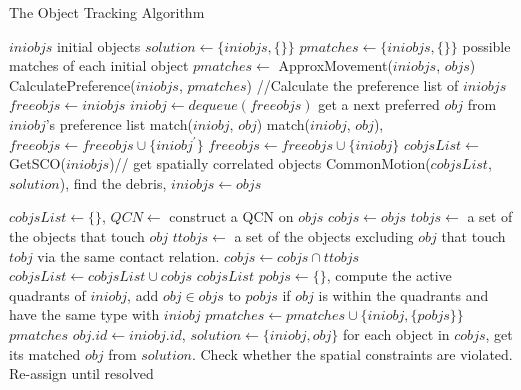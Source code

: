 \documentclass[letterpaper]{article}
\begin{document}
\begin{algorithm}[!]
\caption{The Object Tracking Algorithm}\label{algo}
\begin{algorithmic}[1]
\State $iniobjs$ \Comment initial objects
\State $solution \leftarrow \{iniobjs, \{\}\}$
\State $pmatches \leftarrow \{iniobjs, \{\}\}$ \Comment possible matches of each initial object
\State $pmatches \leftarrow$ ApproxMovement($iniobjs$, $objs$) \label{SetPossible}
\State CalculatePreference($iniobjs$, $pmatches$)\label{calPref} //Calculate the preference list of $iniobjs$
\State $freeobjs \leftarrow iniobjs$
\label{stableMarriage}
\State $iniobj \leftarrow dequeue(freeobjs)$
\State get a next preferred $obj$ from $iniobj$'s preference list  
  \State match($iniobj$, $obj$)
  \State match($iniobj$, $obj$), $freeobjs \leftarrow freeobjs \cup \{iniobj^{\prime}\}$
  \Else 
  \State $freeobjs \leftarrow freeobjs \cup \{iniobj\}$
\EndIf 
\EndIf
\EndWhile
\State $cobjsList \leftarrow$ GetSCO($iniobjs$)// get spatially correlated objects
\State CommonMotion($cobjsList$,$solution$), find the debris, $iniobjs \leftarrow objs$
\EndProcedure

\label{getSCO}
\State $cobjsList \leftarrow \{\}$, $QCN \leftarrow$ construct a QCN on $objs$
\State $cobjs \leftarrow objs$ 
\State $tobjs \leftarrow$ a set of the objects that touch $obj$
\State $ttobjs \leftarrow$ a set of the objects excluding $obj$ that touch $tobj$ via the same contact relation.
\State $cobjs \leftarrow cobjs \cap ttobjs$
\EndFor
\State $cobjsList \leftarrow cobjsList \cup cobjs$
\EndFor
\Return $cobjsList$
\EndProcedure
{}\label{MA}
\State $pobjs \leftarrow \{\}$, compute the active quadrants of $iniobj$, add $obj \in objs$ to $pobjs$ if $obj$ is within the quadrants and have the same type with $iniobj$ 
\State $pmatches \leftarrow pmatches \cup \{iniobj, \{pobjs\}\}$
\EndFor
\Return $pmatches$
\EndProcedure
{}
\State $obj.id \leftarrow iniobj.id$, $solution \leftarrow \{iniobj, obj\}$
\EndProcedure
{}\label{CommonMotion}
\State for each object in $cobjs$, get its matched $obj$ from $solution$. Check whether the spatial constraints are violated. Re-assign until resolved  
\EndFor
\EndProcedure
\end{algorithmic}
\end{algorithm}
 
\end{document}
